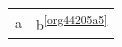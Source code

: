 \documentclass[11pt]{article}
\author{root}
\date{\today}
\title{}
\begin{document}
\tableofcontents

\begin{center}
\begin{tabular}{ll}
a\footnotemark & b\textsuperscript{\ref{org44205a5}}\\[0pt]
\end{tabular}
\end{center}
\end{document}
